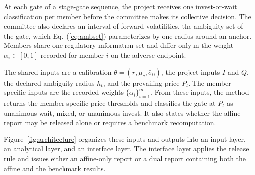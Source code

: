 \documentclass[5p,times,authoryear]{elsarticle}
\theoremstyle{plain}
\newcommand{\sbar}{\bar{\sigma}_0}
\begin{document}
At each gate of a stage-gate sequence, the project receives one invest-or-wait classification per member before the committee makes its collective decision. The committee also declares an interval of forward volatilities, the ambiguity set of the gate, which Eq.~(\ref{eq:ambset}) parameterizes by one radius around an anchor. Members share one regulatory information set and differ only in the weight $\alpha_i\in[0,1]$ recorded for member $i$ on the adverse endpoint.

The shared inputs are a calibration $\theta=(r,\mu_c,\sbar)$, the project inputs $I$ and $Q$, the declared ambiguity radius $h_t$, and the prevailing price $P_t$. The member-specific inputs are the recorded weights $\{\alpha_i\}_{i=1}^{m}$. From these inputs, the method returns the member-specific price thresholds and classifies the gate at $P_t$ as unanimous wait, mixed, or unanimous invest. It also states whether the affine report may be released alone or requires a benchmark recomputation.

Figure~\ref{fig:architecture} organizes these inputs and outputs into an input layer, an analytical layer, and an interface layer. The interface layer applies the release rule and issues either an affine-only report or a dual report containing both the affine and the benchmark results.
\end{document}
